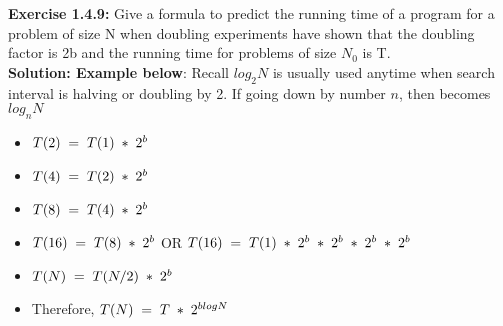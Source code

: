 \documentclass[11pt,fleqn]{article}
\begin{document}
\textbf{Exercise 1.4.9:} Give a formula to predict the running time of a program for a problem of size N
when doubling experiments have shown that the doubling factor is 2b and the running
time for problems of size $N_0$ is T.\\

\textbf{Solution: Example below}: Recall $log_2N$ is usually used anytime when search interval is halving or doubling by 2. If going down by number $n$, then becomes $log_nN$
\begin{itemize}
 \item $T(2) \thickspace = \thickspace T(1) \thickspace * \thickspace 2^b$
 \item $T(4) \thickspace = \thickspace T(2) \thickspace * \thickspace 2^b$
  \item $T(8) \thickspace = \thickspace T(4) \thickspace * \thickspace 2^b$
    \item $T(16) \thickspace = \thickspace T(8) \thickspace * \thickspace 2^b$ OR $T(16) \thickspace = \thickspace T(1) \thickspace * \thickspace 2^b \thickspace * \thickspace 2^b \thickspace * \thickspace 2^b \thickspace * \thickspace 2^b \thickspace$
    \item $T(N) \thickspace = \thickspace T(N/2) \thickspace * \thickspace 2^b$
 	\item Therefore,  $T(N) \thickspace = \thickspace T \thickspace * \thickspace 2^{blogN}$
\end{itemize}
\end{document}
